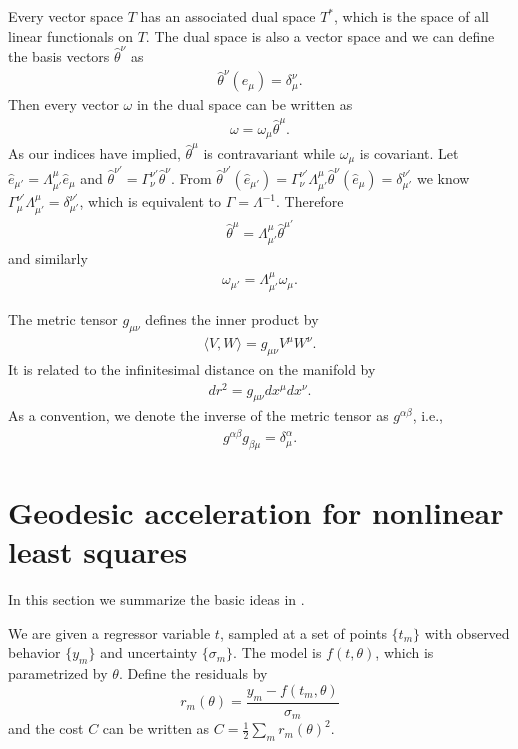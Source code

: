 \documentclass{amsart}
\theoremstyle{definition}
\theoremstyle{remark}
\numberwithin{equation}{section}
\begin{document}
Every vector space $T$ has an associated dual space $T^*$, which is the space of all linear functionals on $T$. The dual space is also a vector space and we can define the basis vectors $\hat{\theta}^\nu$ as 
\begin{align*}
	\hat{\theta}^\nu (\hat{e}_{\mu}) = \delta_\mu^\nu.
\end{align*}
Then every vector $\omega$ in the dual space can be written as
\begin{align*}
 	\omega = \omega_\mu \hat{\theta}^\mu.
\end{align*}
As our indices have implied, $\hat{\theta}^{\mu}$ is contravariant while $\omega_\mu$ is covariant. Let $\hat{e}_{\mu'} = \Lambda_{\mu'}^{\mu} \hat{e}_{\mu}$ and $\hat{\theta}^{\nu'} = \Gamma_{\nu}^{\nu'} \hat{\theta}^{\nu}$. From $\hat{\theta}^{\nu'}(\hat{e}_{\mu'}) = \Gamma_{\nu}^{\nu'}\Lambda^{\mu}_{\mu'}\hat{\theta}^{\nu}(\hat{e}_\mu) = \delta^{\nu'}_{\mu'}$ we know $\Gamma^{\nu'}_\mu \Lambda^\mu_{\mu'} = \delta^{\nu'}_{\mu'}$, which is equivalent to $\Gamma = \Lambda^{-1}$. Therefore
\begin{align*}
\hat{\theta}^{\mu}= \Lambda_{\mu'}^{\mu} \hat{\theta}^{\mu'}
\end{align*}
and similarly
\begin{align*}
\omega_{\mu'} = \Lambda_{\mu'}^{\mu} \omega_{\mu}.
\end{align*}

The metric tensor $g_{\mu\nu}$ defines the inner product by
\begin{align*}
\langle V,W\rangle = g_{\mu\nu} V^\mu W^\nu.
\end{align*}
It is related to the infinitesimal distance on the manifold by
\begin{align*}
dr^2 = g_{\mu\nu} dx^\mu  dx^\nu.
\end{align*}
As a convention, we denote the inverse of the metric tensor as $g^{\alpha\beta}$, i.e.,
\begin{align*}
g^{\alpha\beta} g_{\beta\mu} = \delta^\alpha_\mu.
\end{align*}
\section{Geodesic acceleration for nonlinear least squares}
In this section we summarize the basic ideas in \cite{GeoSethna}.

We are given a regressor variable $t$, sampled at a set of points $\{ t_m \}$ with observed behavior $\{y_m\}$ and uncertainty  $\{\sigma_m\}$. The model is $f(t,\theta)$, which is parametrized by $\theta$. Define the residuals by
\[
	r_m(\theta) = \frac{y_m - f(t_m,\theta)}{\sigma_m}
\]
and the cost $C$ can be written as $C = \frac{1}{2} \sum_{m} r_m(\theta)^2$.
\end{document}
